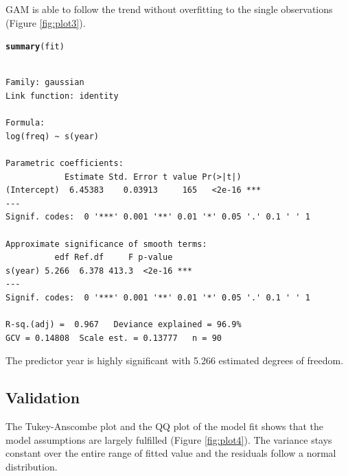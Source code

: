 \documentclass{article}\usepackage[]{graphicx}\usepackage[]{color}
\makeatletter
\newcommand{\hlstd}[1]{\textcolor[rgb]{0.345,0.345,0.345}{#1}}%
\newcommand{\hlkwd}[1]{\textcolor[rgb]{0.737,0.353,0.396}{\textbf{#1}}}%
\newenvironment{kframe}{%
 \def\at@end@of@kframe{}%
 \ifinner\ifhmode%
  \def\at@end@of@kframe{\end{minipage}}%
  \begin{minipage}{\columnwidth}%
 \fi\fi%
 \def\FrameCommand##1{\hskip\@totalleftmargin \hskip-\fboxsep
 \colorbox{shadecolor}{##1}\hskip-\fboxsep
     \hskip-\linewidth \hskip-\@totalleftmargin \hskip\columnwidth}%
 \MakeFramed {\advance\hsize-\width
   \@totalleftmargin\z@ \linewidth\hsize
   \@setminipage}}%
 {\par\unskip\endMakeFramed%
 \at@end@of@kframe}
\newenvironment{knitrout}{}{} %
\makeatother
\begin{document}
GAM is able to follow the trend without overfitting to the single observations (Figure \ref{fig:plot3}).



\begin{knitrout}
\color{fgcolor}\begin{kframe}
\begin{alltt}
\hlkwd{summary}\hlstd{(fit)}
\end{alltt}
\begin{verbatim}

Family: gaussian 
Link function: identity 

Formula:
log(freq) ~ s(year)

Parametric coefficients:
            Estimate Std. Error t value Pr(>|t|)    
(Intercept)  6.45383    0.03913     165   <2e-16 ***
---
Signif. codes:  0 '***' 0.001 '**' 0.01 '*' 0.05 '.' 0.1 ' ' 1

Approximate significance of smooth terms:
          edf Ref.df     F p-value    
s(year) 5.266  6.378 413.3  <2e-16 ***
---
Signif. codes:  0 '***' 0.001 '**' 0.01 '*' 0.05 '.' 0.1 ' ' 1

R-sq.(adj) =  0.967   Deviance explained = 96.9%
GCV = 0.14808  Scale est. = 0.13777   n = 90
\end{verbatim}
\end{kframe}
\end{knitrout}


The predictor year is highly significant with 5.266 estimated degrees of freedom.


\subsection{Validation}

The Tukey-Anscombe plot and the QQ plot of the model fit shows that the model assumptions are largely fulfilled (Figure \ref{fig:plot4}). The variance stays constant over the entire range of fitted value and the residuals follow a normal distribution.
\end{document}
